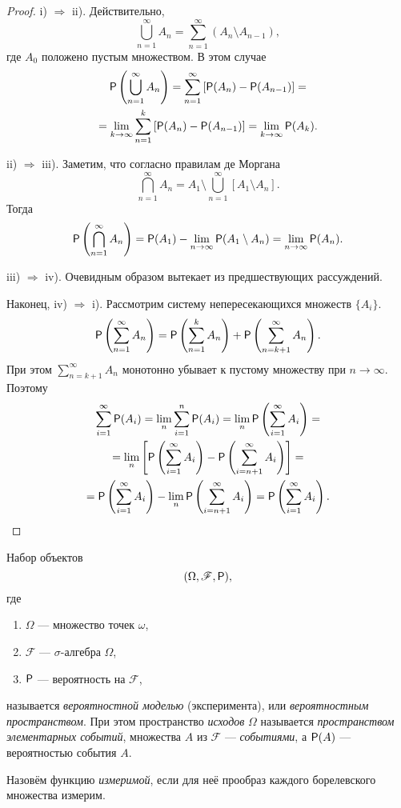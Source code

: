 \begin{proof}
i) $ \Rightarrow $ ii). Действительно, 
\[
	\bigcup_{n=1}^\infty A_n = \sum_{n=1}^\infty (A_n \setminus A_{n-1}),
\]
где $ A_0 $ положено пустым множеством. В этом случае 
\begin{multline*}
	\mathsf P \left( \bigcup_{n=1}^\infty A_n \right) = \sum_{n=1}^\infty \left[ \mathsf P(A_n) -
	\mathsf P(A_{n-1}) \right] =\\= \lim_{k\to\infty} \sum_{n=1}^k \left[ \mathsf P(A_n) -
\mathsf P(A_{n-1}) \right] = \lim_{k\to\infty} \mathsf P(A_k).
\end{multline*}

ii) $\Rightarrow$ iii). Заметим, что согласно правилам де Моргана
\[
	\bigcap_{n=1}^\infty A_n = A_1 \setminus \bigcup_{n=1}^\infty \left[ A_1 \setminus A_n
	\right].
\]
Тогда 
\[
	\mathsf P \left( \bigcap_{n=1}^\infty A_n \right) = \mathsf P(A_1) - \lim_{n\to\infty}
	\mathsf P(A_1 \setminus A_n) = \lim_{n\to\infty} \mathsf P(A_n).
\]

iii) $ \Rightarrow $ iv). Очевидным образом вытекает из предшествующих
рассуждений.

Наконец, iv) $ \Rightarrow $ i). Рассмотрим систему непересекающихся множеств $
\{A_i\}$.  
\[
	\mathsf P\left(\sum_{n=1}^\infty A_n\right) = \mathsf P \left( \sum_{n=1}^k A_n
	\right) + \mathsf P \left( \sum_{n=k+1}^\infty A_n \right).
\]
При этом $ \sum\limits_{n=k+1}^\infty A_n $ монотонно убывает к пустому множеству при
$ n \to\infty $. Поэтому 
\begin{multline*}
	\sum_{i=1}^\infty \mathsf P(A_i) = \lim_n \sum_{i=1}^n \mathsf P(A_i) = \lim_n \mathsf P
	\left( \sum_{i=1}^\infty A_i \right) = \\ =
	\lim_n \left[ \mathsf P \left( \sum_{i=1}^\infty A_i \right) - \mathsf P \left(
	\sum_{i=n+1}^\infty A_i \right)  \right] =\\=
	\mathsf P \left( \sum_{i=1}^\infty A_i \right)  -\lim_n \mathsf P \left(
	\sum_{i=n+1}^\infty A_i \right) = \mathsf P \left( \sum_{i=1}^\infty A_i \right).
\end{multline*}


\end{proof}

\begin{definition}[основное]
	Набор объектов  
	\[
		(\Omega, \mathscr F, \mathsf P),
	\]
	где 
	\begin{enumerate}[label=\alph*)]
		\item $ \Omega $ --- множество точек $ \omega $,
		\item $ \mathscr F $ --- $ \sigma $-алгебра $ \Omega $,
		\item	$ \mathsf P $ --- вероятность на $ \mathscr F $,
	\end{enumerate}
	называется \emph{вероятностной моделью} (эксперимента), или
	\emph{вероятностным пространством}. При этом пространство \emph{исходов}
	$\Omega $ называется \emph{пространством элементарных событий}, множества $ A
	$ из $ \mathscr F $ --- \emph{событиями}, а $ \mathsf P(A) $ --- вероятностью
	события $ A $.
\end{definition} 

\begin{definition}
  Назовём функцию \emph{измеримой}, если для неё прообраз каждого борелевского множества
  измерим.
\end{definition}

